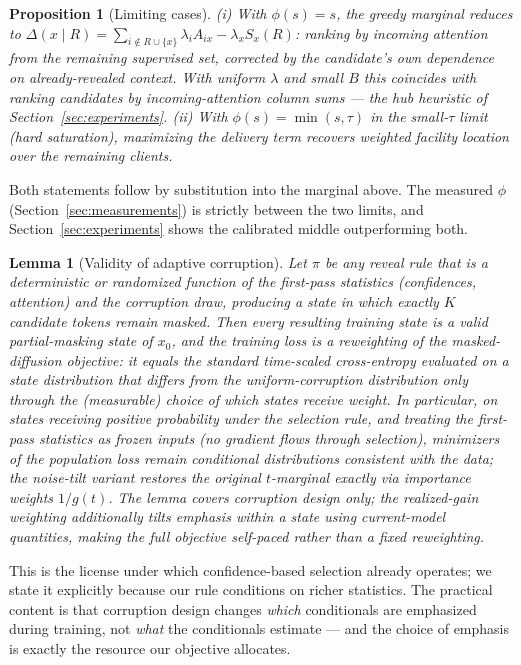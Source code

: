 \documentclass{article} %
\newtheorem{proposition}{Proposition}
\newtheorem{lemma}{Lemma}
\begin{document}
\begin{proposition}[Limiting cases]
\label{prop:limits}
(i) With $\phi(s) = s$, the greedy marginal reduces to
$\Delta(x \mid R) = \sum_{i \notin R \cup \{x\}} \lambda_i A_{ix} - \lambda_x S_x(R)$:
ranking by incoming attention from the remaining supervised set, corrected by the candidate's own dependence on already-revealed context. With uniform $\lambda$ and small $B$ this coincides with ranking candidates by incoming-attention column sums --- the hub heuristic of Section~\ref{sec:experiments}. (ii) With $\phi(s) = \min(s, \tau)$ in the small-$\tau$ limit (hard saturation), maximizing the delivery term recovers weighted facility location over the remaining clients.
\end{proposition}

Both statements follow by substitution into the marginal above. The measured $\phi$ (Section~\ref{sec:measurements}) is strictly between the two limits, and Section~\ref{sec:experiments} shows the calibrated middle outperforming both.

\begin{lemma}[Validity of adaptive corruption]
\label{lem:valid}
Let $\pi$ be any reveal rule that is a deterministic or randomized function of the first-pass statistics (confidences, attention) and the corruption draw, producing a state in which exactly $K$ candidate tokens remain masked. Then every resulting training state is a valid partial-masking state of $x_0$, and the training loss is a reweighting of the masked-diffusion objective: it equals the standard time-scaled cross-entropy evaluated on a state distribution that differs from the uniform-corruption distribution only through the (measurable) choice of which states receive weight. In particular, on states receiving positive probability under the selection rule, and treating the first-pass statistics as frozen inputs (no gradient flows through selection), minimizers of the population loss remain conditional distributions consistent with the data; the noise-tilt variant restores the original $t$-marginal exactly via importance weights $1/g(t)$. The lemma covers corruption design only; the realized-gain weighting additionally tilts emphasis \emph{within} a state using current-model quantities, making the full objective self-paced rather than a fixed reweighting.
\end{lemma}

This is the license under which confidence-based selection \citep{lift2026} already operates; we state it explicitly because our rule conditions on richer statistics. The practical content is that corruption design changes \emph{which} conditionals are emphasized during training, not \emph{what} the conditionals estimate --- and the choice of emphasis is exactly the resource our objective allocates.
\end{document}
